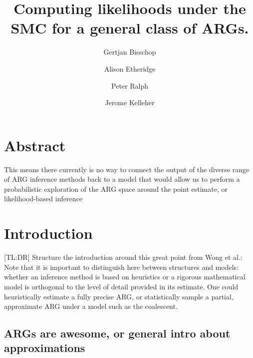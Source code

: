 \documentclass{article}
\begin{document}
\linenumbers
\title{Computing likelihoods under the SMC for a general class of ARGs.}

\author[1, $\dagger$]{Gertjan Bisschop}

\author[2]{Alison Etheridge}
\author[3]{Peter Ralph}

\author[1]{Jerome Kelleher}

\maketitle


\section{Abstract}
This means there currently is no way to connect the output of the diverse 
range of ARG inference methods back 
to a model that would allow us to perform a probabilistic exploration of the 
ARG space around the point estimate, or likelihood-based inference

\section{Introduction}

[TL:DR] Structure the introduction around this great point from Wong et al.:
Note that it is important to distinguish here between structures and models: 
whether an inference method is based on 
heuristics or a rigorous mathematical model is orthogonal to the level 
of detail provided in its estimate. One could heuristically estimate a 
fully precise ARG, or statistically sample a partial, approximate ARG under 
a model such as the coalescent.


\subsection{ARGs are awesome, or general intro about approximations}
\end{document}
